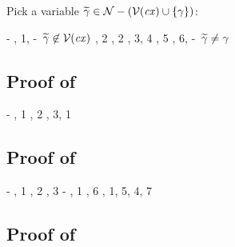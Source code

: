 Pick a variable $\widetilde{\gamma}\in\mathcal{N}-(\mathcal{V}(\mathit{cx})\cup\{\gamma\})$:
\begin{derivation}
\step{\cxwfO}
     {\hyp}
\step{\cxwf{\snoc{\cx}{\vdec{\varFX}{\bool}}}}
     {\Rcxvdecbool, 1, \hyp\ $\widetilde{\gamma}\not\in\mathcal{V}(\mathit{cx})$}
\step{\hasty{\snoc{\cx}{\vdec{\varFX}{\bool}}}{\varFX}{\bool}}
     {\Revar, 2}
\step{\hasty{\snoc{\cx}{\vdec{\varFX}{\bool}}}{\false}{\bool}}
     {\Refalse, 2}
\step{\hasty{\snoc{\cx}{\vdec{\varFX}{\bool}}}
            {\eq{\varFX}{\false}}
            {\bool}}
     {\Reeq, 3, 4}
\step{\hastyO{\abs{\varFX}{\bool}{(\eq{\varFX}{\false})}}
             {\tarr{\bool}{\bool}}}
     {\Reabs, 5}
\step{\hastyO{\abs{\varfx}{\bool}{(\eq{\varfx}{\false})}}
             {\tarr{\bool}{\bool}}}
     {\Reabsalpha, 6, \hyp\ $\widetilde{\gamma}\neq\gamma$}
\end{derivation}



\subsection*{Proof of }

\begin{derivation}
\step{\hastyO{\expr}{\bool}}
     {\hyp}
\step{\cxwfO}
     {, 1}
\step{\hastyO{\negaop}{\tarr{\bool}{\bool}}}
     {\Renot, 2}
\step{\hastyO{\negaO}{\bool}}
     {\Reapp, 3, 1}
\end{derivation}



\subsection*{Proof of }

\begin{derivation}
     {\hyp}
     {\Renega, 1}
     {\Rcxaxmono, 2}
     {\Refalse, 3}
     {\hyp}
\step{\cxwfO}
     {, 1}
\step{\istyO{\bool}}
     {\Rtbool, 6}
     {\Reif, 1, 5, 4, 7}
\end{derivation}



\subsection*{Proof of }

